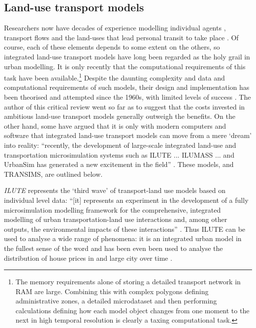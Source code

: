 \subsection{Land-use transport models}
Researchers now have decades of experience modelling individual agents
\citep{Ortuzar1982},
transport flows \citep{Wilson1970} and the land-uses that lead personal
transit to take place \citep{batty1976urban}.
Of course, each of these elements depends to some extent on the others, so
integrated land-use transport models have long been regarded as the holy grail
in urban modelling. It is only recently that the computational
requirements of this task have been
available.\footnote{The memory requirements alone of storing a detailed
transport network in RAM are large. Combining this with complex polygons
defining administrative zones, a detailed microdataset and then performing
calculations defining how each model object changes from one moment to the next
in high temporal resolution is clearly a taxing computational task.
}
Despite the daunting complexity and data and computational requirements of such
models, their design and implementation has been theorised and attempted
since the 1960s, with limited levels of success
\citep{timmermans2003saga}. The author of this critical review went so far as
to suggest that the costs invested in ambitious land-use transport models
generally outweigh the benefits.
On the other hand, some have argued that it is only with modern computers and software
that integrated land-use transport models can move from a mere
`dream' \citep{timmermans2003saga}  into reality: ``recently,
the development of large-scale integrated land-use and
transportation microsimulation systems such as ILUTE ... ILUMASS
... and UrbanSim has generated a new excitement in the field'' \citep[p.~935]{Pinjari2011}.
These models, and TRANSIMS, are outlined below.


\emph{ILUTE}  represents the `third wave' of transport-land use
models based on individual level data:
``[it] represents an experiment in the development of a
fully microsimulation modelling
framework for the comprehensive, integrated modelling of urban transportation-land use
interactions and, among other outputs, the environmental impacts of these interactions''
\citep[p.~15]{timmermans2003saga}. Thus ILUTE can be used to analyse a wide range
of phenomena: it is an integrated urban model in the fullest sense of the word
and has been even been used to analyse the distribution of house prices
in and large city over time \citep{Farooq2012-integreted}.

